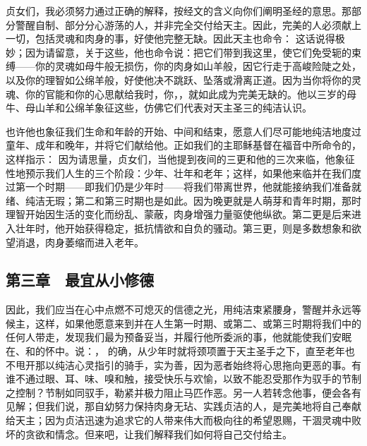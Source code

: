贞女们，我必须努力通过正确的解释，按经文的含义向你们阐明圣经的意思。那部分警醒自制、部分分心游荡的人，并非完全交付给天主。因此，完美的人必须献上一切，包括灵魂和肉身的事，好使他完整无缺。因此天主也命令： 这话说得极妙；因为请留意，关于这些，他也命令说：把它们带到我这里，使它们免受轭的束缚——你的灵魂如母牛般无损伤，你的肉身如山羊般，因它行走于高峻险陡之处，以及你的理智如公绵羊般，好使他决不跳跃、坠落或滑离正道。因为当你将你的灵魂、你的官能和你的心思献给我时，你，，就如此成为完美无缺的。他以三岁的母牛、母山羊和公绵羊象征这些，仿佛它们代表对天主圣三的纯洁认识。\par

也许他也象征我们生命和年龄的开始、中间和结束，愿意人们尽可能地纯洁地度过童年、成年和晚年，并将它们献给他。正如我们的主耶稣基督在福音中所命令的，这样指示： 因为请思量，贞女们，当他提到夜间的三更和他的三次来临，他象征性地预示我们人生的三个阶段：少年、壮年和老年；这样，如果他来临并在我们度过第一个时期——即我们仍是少年时——将我们带离世界，他就能接纳我们准备就绪、纯洁无瑕；第二和第三时期也是如此。因为晚更就是人萌芽和青年时期，那时理智开始因生活的变化而纷乱、蒙蔽，肉身增强力量驱使他纵欲。第二更是后来进入壮年时，他开始获得稳定，抵抗情欲和自负的骚动。第三更，则是多数想象和欲望消退，肉身萎缩而进入老年。\par


\subsection{第三章　最宜从小修德}

因此，我们应当在心中点燃不可熄灭的信德之光，用纯洁束紧腰身，警醒并永远等候主，这样，如果他愿意来到并在人生第一时期、或第二、或第三时期将我们中的任何人带走，发现我们最为预备妥当，并履行他所委派的事，他就能使我们安眠在、和的怀中。说：，   的确，从少年时就将颈项置于天主圣手之下，直至老年也不甩开那以纯洁心灵指引的骑手，实为善，因为恶者始终将心思拖向更恶的事。有谁不通过眼、耳、味、嗅和触，接受快乐与欢愉，以致不能忍受那作为驭手的节制之控制？节制如同驭手，勒紧并极力阻止马匹作恶。另一人若转念他事，便会各有见解；但我们说，那自幼努力保持肉身无玷、实践贞洁的人，是完美地将自己奉献给天主；因为贞洁迅速为追求它的人带来伟大而极向往的希望恩赐，干涸灵魂中败坏的贪欲和情念。但来吧，让我们解释我们如何将自己交付给主。\par

